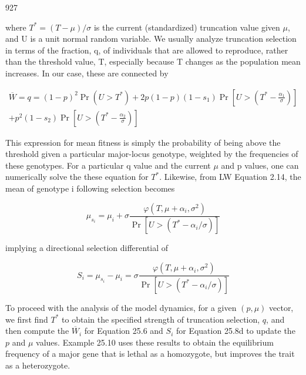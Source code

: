 \documentclass{article}
\begin{document}
927

where  $ T^* = (T - \mu)/\sigma $ is the current (standardized) truncation value given  $ \mu $, and U is a unit normal random variable. We usually analyze truncation selection in terms of the fraction, q, of individuals that are allowed to reproduce, rather than the threshold value, T, especially because T changes as the population mean increases. In our case, these are connected by

\begin{equation}
\begin{aligned}\overline{W}=q=(1-p)^{2}\Pr(U>T^{*})+2p(1-p)(1-s_{1})\Pr\left[U>\left(T^{*}-\frac{\alpha_{1}}{\sigma}\right)\right]\\+p^{2}(1-s_{2})\Pr\left[U>\left(T^{*}-\frac{\alpha_{2}}{\sigma}\right)\right]\end{aligned}
\end{equation}

This expression for mean fitness is simply the probability of being above the threshold given a particular major-locus genotype, weighted by the frequencies of these genotypes. For a particular q value and the current  $ \mu $ and p values, one can numerically solve the these equation for  $ T^{*} $. Likewise, from LW Equation 2.14, the mean of genotype i following selection becomes

\begin{equation}
\mu_{s_{i}}=\mu_{i}+\sigma\frac{\varphi(T,\mu+\alpha_{i},\sigma^{2})}{\Pr[U>(T^{*}-\alpha_{i}/\sigma)]}
\end{equation}

implying a directional selection differential of

\begin{equation}
S_{i}=\mu_{s_{i}}-\mu_{i}=\sigma\frac{\varphi(T,\mu+\alpha_{i},\sigma^{2})}{\Pr[U>(T^{*}-\alpha_{i}/\sigma)]}
\end{equation}

To proceed with the analysis of the model dynamics, for a given  $ (p, \mu) $ vector, we first find  $ T^* $ to obtain the specified strength of truncation selection,  $ q $, and then compute the  $ \overline{W}_i $ for Equation 25.6 and  $ S_i $ for Equation 25.8d to update the  $ p $ and  $ \mu $ values. Example 25.10 uses these results to obtain the equilibrium frequency of a major gene that is lethal as a homozygote, but improves the trait as a heterozygote.
\end{document}
